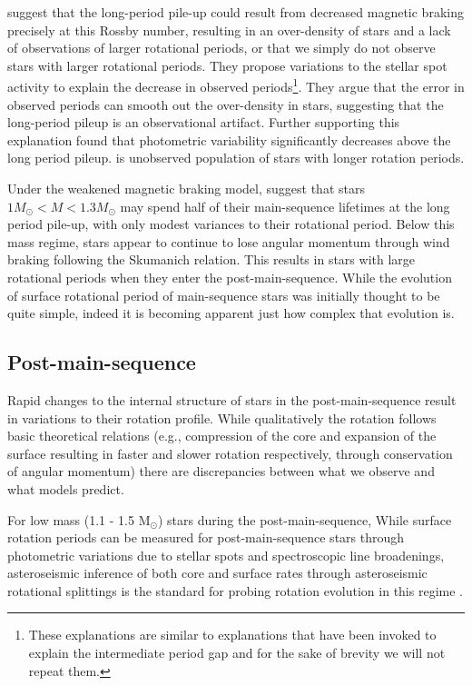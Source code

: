 \citet{van_saders_forward_2019} suggest that the long-period pile-up could result from decreased magnetic braking precisely at this Rossby number, resulting in an over-density of stars and a lack of observations of larger rotational periods, or that we simply do not observe stars with larger rotational periods.
They propose variations to the stellar spot activity to explain the decrease in observed periods\footnote{These explanations are similar to explanations that have been invoked to explain the intermediate period gap and for the sake of brevity we will not repeat them.}.
They argue that the error in observed periods can smooth out the over-density in stars, suggesting that the long-period pileup is an observational artifact.
Further supporting this explanation \citet{david_further_2022} found that photometric variability significantly decreases above the long period pileup.
 is unobserved population of stars with longer rotation periods.

Under the weakened magnetic braking model, \citet{david_further_2022} suggest that stars $1M_{\odot} < M < 1.3M_{\odot}$  may spend half of their main-sequence lifetimes at the long period pile-up, with only modest variances to their rotational period.
Below this mass regime, stars appear to continue to lose angular momentum through wind braking following the Skumanich relation.
This results in stars with large rotational periods when they enter the post-main-sequence.
While the evolution of surface rotational period of main-sequence stars was initially thought to be quite simple, indeed it is becoming apparent just how complex that evolution is.


\subsection{Post-main-sequence}

Rapid changes to the internal structure of stars in the post-main-sequence result in variations to their rotation profile.
While qualitatively the rotation follows basic theoretical relations (e.g., compression of the core and expansion of the surface resulting in faster and slower rotation respectively, through conservation of angular momentum) there are discrepancies between what we observe and what models predict.

For low mass (1.1 - 1.5 M$_{\odot}$) stars during the post-main-sequence, 
While surface rotation periods can be measured for post-main-sequence stars through photometric variations due to stellar spots \citep{mcquillan_rotation_2014, ceillier_surface_2017} and spectroscopic line broadenings, asteroseismic inference of both core and surface rates through asteroseismic rotational splittings is the standard for probing rotation evolution in this regime \citep{deheuvels_seismic_2014, gehan_core_2018, deheuvels_seismic_2020, fellay_asteroseismology_2021}.

